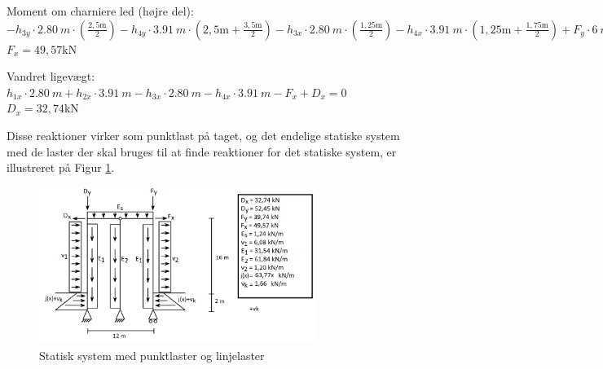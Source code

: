 \begin{center}
	Moment om charniere led (højre del): $- h_{3y} \cdot \SI{2,80}{m} \cdot (\frac{2,5 \text{m}}{2}) - h_{4y} \cdot \SI{3,91}{m} \cdot (2,\!5 \text{m} + \frac{3,5 \text{m}}{2}) - h_{3x} \cdot \SI{2,80}{m} \cdot (\frac{1,25 \text{m}}{2}) - h_{4x} \cdot \SI{3,91}{m} \cdot (1,\!25 \text{m} + \frac{1,75 \text{m}}{2}) + F_y \cdot \SI{6}{m} - F_x \cdot \SI{3}{m} = 0$ 
	\newline
	$F_x = 49,\!57 \text{kN}$
\end{center}

\begin{center}
	Vandret ligevægt: $h_{1x} \cdot \SI{2,80}{m} + h_{2x} \cdot \SI{3,91}{m} - h_{3x} \cdot \SI{2,80}{m} - h_{4x} \cdot \SI{3,91}{m} - F_x + D_x = 0$
	\newline
	$D_x = 32,\!74 \text{kN}$
\end{center}

Disse reaktioner virker som punktlast på taget, og det endelige statiske system med de laster der skal bruges til at finde reaktioner for det statiske system, er illustreret på Figur \ref{fig:alle}. 

\begin{figure}[htbp]
	\centering
	\includegraphics[width=0.8\textwidth]{billeder/endeligesystemmedlaster.png}
	\caption{Statisk system med punktlaster og linjelaster}
	\label{fig:alle}
\end{figure}